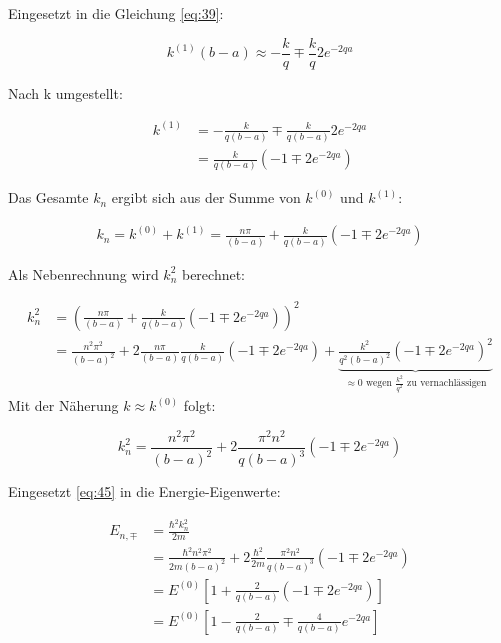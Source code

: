 Eingesetzt in die Gleichung \eqref{eq:39}:

\begin{equation}
  \label{eq:41}
    k^{(1)}(b-a) \approx - \frac{k}{q} \mp \frac{k}{q} 2e^{-2qa}
\end{equation}

Nach k umgestellt:

\begin{align}
  \label{eq:42}
  k^{(1)} &= - \frac{k}{q(b-a)} \mp \frac{k}{q(b-a)} 2e^{-2qa}\\
&= \frac{k}{q(b-a)}\left( -1 \mp  2e^{-2qa}\right)
\end{align}

Das Gesamte \(k_n\) ergibt sich aus der Summe von \(k^{(0)}\) und \(k^{(1)}\):

\begin{align}
  \label{eq:43}
  k_n = k^{(0)}+k^{(1)} = \frac{n\pi}{(b-a)} + \frac{k}{q(b-a)}( -1 \mp  2e^{-2qa})
\end{align}

Als Nebenrechnung wird \(k_n^2\) berechnet:

\begin{align}
  \label{eq:44}
  k_n^2 &= (\frac{n\pi}{(b-a)} + \frac{k}{q(b-a)}( -1 \mp  2e^{-2qa}))^2 \\
&=\frac{n^2\pi^2}{(b-a)^2} + 2\frac{n\pi}{(b-a)} \frac{k}{q(b-a)}( -1 \mp  2e^{-2qa}) + \underbrace{\frac{k^2}{q^2(b-a)^2}( -1 \mp  2e^{-2qa})^2}_{\approx 0 \text{ wegen } \frac{k^2}{q^2} \text{ zu vernachlässigen}}
\end{align}
Mit der Näherung \(k \approx k^{(0)}\) folgt:

\begin{equation}
  \label{eq:45}
  k_n^2 =\frac{n^2\pi^2}{(b-a)^2} + 2\frac{\pi^2 n^2}{q(b-a)^3}( -1 \mp  2e^{-2qa})
\end{equation}

Eingesetzt \eqref{eq:45} in die Energie-Eigenwerte:

\begin{align}
  \label{eq:46}
  E_{n,\mp} &= \frac{\hbar^2 k_n^2}{2m}\\
&=  \frac{\hbar^2 n^2\pi^2}{2m(b-a)^2} + 2\frac{\hbar^2 }{2m}\frac{\pi^2 n^2}{q(b-a)^3}( -1 \mp  2e^{-2qa}) \\
&= E^{(0)}\left[1+\frac{2}{q(b-a)}( -1 \mp  2e^{-2qa})  \right] \\
&= E^{(0)}\left[1-\frac{2}{q(b-a)} \mp \frac{4}{q(b-a)}e^{-2qa}  \right]
\end{align}


